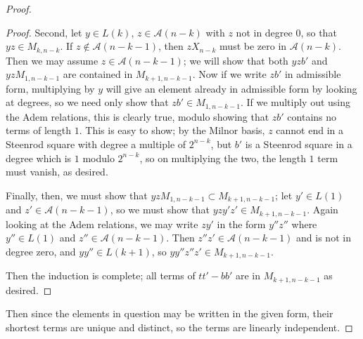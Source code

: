 \documentclass{article}
\newcommand{\A}{\mathcal{A}}
\begin{document}
\begin{proof}
\begin{proof}
    Second, let $y\in L(k)$, $z\in \A(n-k)$ with $z$ not in degree $0$, so that $yz\in M_{k,n-k}$.  If $z\not\in\A(n-k-1)$, then $zX_{n-k}$ must be zero in $\A(n-k)$.  Then we may assume $z\in\A(n-k-1)$; we will show that both $yzb'$ and $yzM_{1,n-k-1}$ are contained in $M_{k+1,n-k-1}$.  Now if we write $zb'$ in admissible form, multiplying by $y$ will give an element already in admissible form by looking at degrees, so we need only show that $zb'\in M_{1,n-k-1}$.  If we multiply out using the Adem relations, this is clearly true, modulo showing that $zb'$ contains no terms of length $1$.  This is easy to show; by the Milnor basis, $z$ cannot end in a Steenrod square with degree a multiple of $2^{n-k}$, but $b'$ is a Steenrod square in a degree which is $1$ modulo $2^{n-k}$, so on multiplying the two, the length $1$ term must vanish, as desired.

    Finally, then, we must show that $yzM_{1,n-k-1}\subset M_{k+1,n-k-1}$; let $y'\in L(1)$ and $z'\in\A(n-k-1)$, so we must show that $yzy'z'\in M_{k+1,n-k-1}$.  Again looking at the Adem relations, we may write $zy'$ in the form $y''z''$ where $y''\in L(1)$ and $z''\in\A(n-k-1)$.  Then $z''z'\in \A(n-k-1)$ and is not in degree zero, and $yy''\in L(k+1)$, so $yy''z''z'\in M_{k+1,n-k-1}$.

    Then the induction is complete; all terms of $tt'-bb'$ are in $M_{k+1,n-k-1}$ as desired.
    \end{proof}

    Then since the elements in question may be written in the given form, their shortest terms are unique and distinct, so the terms are linearly independent.
  \end{proof}
\end{document}
